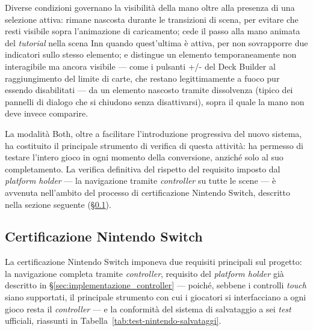 Diverse condizioni governano la visibilità della mano oltre alla presenza di una selezione attiva: rimane nascosta durante le transizioni di scena, per evitare che resti visibile sopra l'animazione di caricamento; cede il passo alla mano animata del \textit{tutorial} nella scena Inn quando quest'ultima è attiva, per non sovrapporre due indicatori sullo stesso elemento; e distingue un elemento temporaneamente non interagibile ma ancora visibile — come i pulsanti +/- del Deck Builder al raggiungimento del limite di carte, che restano legittimamente a fuoco pur essendo disabilitati — da un elemento nascosto tramite dissolvenza (tipico dei pannelli di dialogo che si chiudono senza disattivarsi), sopra il quale la mano non deve invece comparire.
 
La modalità Both, oltre a facilitare l'introduzione progressiva del nuovo sistema, ha costituito il principale strumento di verifica di questa attività: ha permesso di testare l'intero gioco in ogni momento della conversione, anziché solo al suo completamento. La verifica definitiva del rispetto del requisito imposto dal \textit{platform holder} — la navigazione tramite \textit{controller} su tutte le scene — è avvenuta nell'ambito del processo di certificazione Nintendo Switch, descritto nella sezione seguente (\S\ref{sec:certificazione-switch}).
 
\subsection{Certificazione Nintendo Switch}
\label{sec:certificazione-switch}
 
 
La certificazione Nintendo Switch imponeva due requisiti principali sul progetto: la navigazione completa tramite \textit{controller}, requisito del \textit{platform holder} già descritto in \S\ref{sec:implementazione_controller} — poiché, sebbene i controlli \textit{touch} siano supportati, il principale strumento con cui i giocatori si interfacciano a ogni gioco resta il \textit{controller} — e la conformità del sistema di salvataggio a sei \textit{test} ufficiali, riassunti in Tabella~\ref{tab:test-nintendo-salvataggi}.
 
